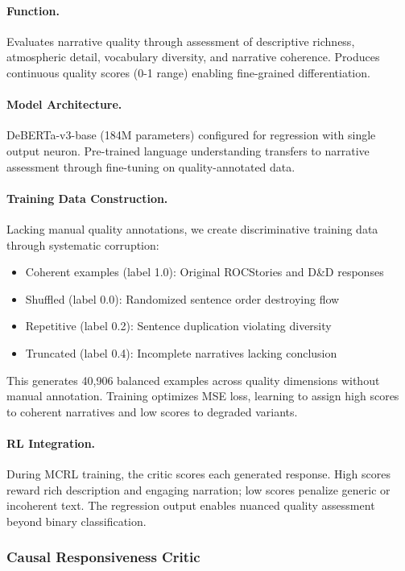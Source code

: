 \documentclass[11pt]{article}
\begin{document}
\paragraph{Function.} Evaluates narrative quality through assessment of descriptive richness, atmospheric detail, vocabulary diversity, and narrative coherence. Produces continuous quality scores (0-1 range) enabling fine-grained differentiation.

\paragraph{Model Architecture.} DeBERTa-v3-base (184M parameters) configured for regression with single output neuron. Pre-trained language understanding transfers to narrative assessment through fine-tuning on quality-annotated data.

\paragraph{Training Data Construction.} Lacking manual quality annotations, we create discriminative training data through systematic corruption:

\begin{itemize}
\item Coherent examples (label 1.0): Original ROCStories and D\&D responses
\item Shuffled (label 0.0): Randomized sentence order destroying flow
\item Repetitive (label 0.2): Sentence duplication violating diversity
\item Truncated (label 0.4): Incomplete narratives lacking conclusion
\end{itemize}

This generates 40,906 balanced examples across quality dimensions without manual annotation. Training optimizes MSE loss, learning to assign high scores to coherent narratives and low scores to degraded variants.

\paragraph{RL Integration.} During MCRL training, the critic scores each generated response. High scores reward rich description and engaging narration; low scores penalize generic or incoherent text. The regression output enables nuanced quality assessment beyond binary classification.

\subsubsection{Causal Responsiveness Critic}
\end{document}
